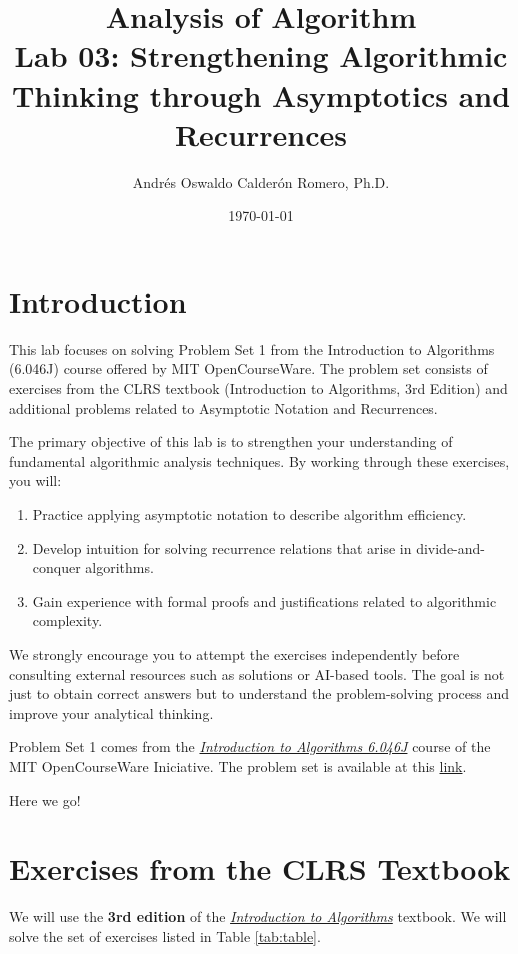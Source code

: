 \documentclass[12pt]{article}
\title{Analysis of Algorithm \\ Lab 03: Strengthening Algorithmic Thinking through Asymptotics and Recurrences}
\author{Andrés Oswaldo Calderón Romero, Ph.D.}
\date{\today}
\begin{document}
\maketitle

\section{Introduction}
This lab focuses on solving Problem Set 1 from the Introduction to Algorithms (6.046J) course offered by MIT OpenCourseWare. The problem set consists of exercises from the CLRS textbook (Introduction to Algorithms, 3rd Edition) and additional problems related to Asymptotic Notation and Recurrences.

The primary objective of this lab is to strengthen your understanding of fundamental algorithmic analysis techniques. By working through these exercises, you will:

\begin{enumerate}
    \item Practice applying asymptotic notation to describe algorithm efficiency.
    \item Develop intuition for solving recurrence relations that arise in divide-and-conquer algorithms.
    \item Gain experience with formal proofs and justifications related to algorithmic complexity.
\end{enumerate}

We strongly encourage you to attempt the exercises independently before consulting external resources such as solutions or AI-based tools. The goal is not just to obtain correct answers but to understand the problem-solving process and improve your analytical thinking.

Problem Set 1 comes from the \href{https://ocw.mit.edu/courses/6-046j-introduction-to-algorithms-sma-5503-fall-2005/}{\textit{Introduction to Algorithms 6.046J}} course of the MIT OpenCourseWare Iniciative.  The problem set is available at this \href{https://ocw.mit.edu/courses/6-046j-introduction-to-algorithms-sma-5503-fall-2005/21bf373b58dcd53a7650a8072a76a448_ps1.pdf}{link}.

Here we go!

\section{Exercises from the CLRS Textbook}\label{sec:exercises}
We will use the \textbf{3rd edition} of the \href{https://mitpress.mit.edu/9780262533058/introduction-to-algorithms/}{\textit{Introduction to Algorithms}} textbook. We will solve the set of exercises listed in Table \ref{tab:table}.
\end{document}
